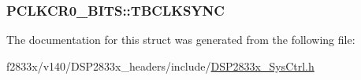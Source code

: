 \subsubsection[{T\+B\+C\+L\+K\+S\+Y\+N\+C}]{ P\+C\+L\+K\+C\+R0\+\_\+\+B\+I\+T\+S\+::\+T\+B\+C\+L\+K\+S\+Y\+N\+C}\label{struct_p_c_l_k_c_r0___b_i_t_s_a28851e1f4a0d0fee2a1eb66fd339f75c}


The documentation for this struct was generated from the following file\+:\begin{DoxyCompactItemize}
\item 
f2833x/v140/\+D\+S\+P2833x\+\_\+headers/include/\hyperlink{_d_s_p2833x___sys_ctrl_8h}{D\+S\+P2833x\+\_\+\+Sys\+Ctrl.\+h}\end{DoxyCompactItemize}
